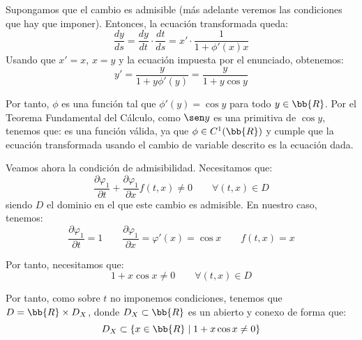 \documentclass[12pt]{article}
\begin{document}
\begin{ejercicio}
\begin{enumerate}
            Supongamos que el cambio es admisible (más adelante veremos las condiciones que hay que imponer). Entonces, la ecuación transformada queda:
            \begin{equation*}
                \dfrac{dy}{ds}=\dfrac{dy}{dt}\cdot \dfrac{dt}{ds}=x'\cdot \dfrac{1}{1+\phi'(x)x}
            \end{equation*}
            Usando que $x'=x$, $x=y$ y la ecuación impuesta por el enunciado, obtenemos:
            \begin{equation*}
                y'=\dfrac{y}{1+y\phi'(y)} = \dfrac{y}{1+y\cos y}
            \end{equation*}

            Por tanto, $\phi$ es una función tal que $\phi'(y)=\cos y$ para todo $y\in\bb{R}$. Por el Teorema Fundamental del Cálculo, como $\sen y$ es una primitiva de $\cos y$, tenemos que:
            es una función válida, ya que $\phi\in C^1(\bb{R})$ y cumple que la ecuación transformada usando el cambio de variable descrito es la ecuación dada.

            Veamos ahora la condición de admisibilidad. Necesitamos que:
            \begin{equation*}
                \dfrac{\partial \varphi_1}{\partial t}+\dfrac{\partial \varphi_1}{\partial x}f(t,x)\neq 0\qquad \forall (t,x)\in D
            \end{equation*}
            siendo $D$ el dominio en el que este cambio es admisible. En nuestro caso, tenemos:
            \begin{equation*}
                \dfrac{\partial \varphi_1}{\partial t}=1\qquad \dfrac{\partial \varphi_1}{\partial x}=\varphi'(x)=\cos x\qquad f(t,x)=x
            \end{equation*}

            Por tanto, necesitamos que:
            \begin{equation*}
                1+x\cos x\neq 0\qquad \forall (t,x)\in D
            \end{equation*}

            Por tanto, como sobre $t$ no imponemos condiciones, tenemos que $D=\bb{R}\times D_X$, donde $D_X\subset \bb{R}$ es un abierto y conexo de forma que:
            \begin{equation*}
                D_X\subset \{x\in\bb{R} \mid 1+x\cos x\neq 0\}
            \end{equation*}


\end{enumerate}
\end{ejercicio}
\end{document}

